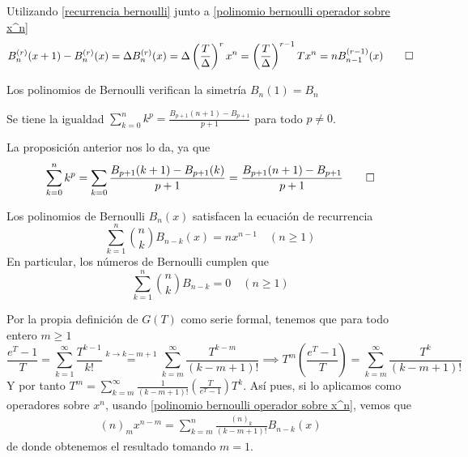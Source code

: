 \begin{demo}
    Utilizando \ref{recurrencia bernoulli} junto a \ref{polinomio bernoulli operador sobre x^n}
    \begin{equation*}
        B_n^{(r)}(x+1) - B_n^{(r)}(x) = \Delta B_n^{(r)}(x) = \Delta \left(\frac{T}{\Delta}\right)^r x^n = \left(\frac{T}{\Delta}\right)^{r-1} T x^n = nB_{n-1}^{(r-1)}(x) \qedhere
    \end{equation*}
\end{demo}

\begin{corolario} \label{simetria bernoulli}
    Los polinomios de Bernoulli verifican la simetría $B_n(1) = B_n$
\end{corolario}

\begin{corolario}
    Se tiene la igualdad $\sum_{k=0}^n k^p =  \frac{B_{p+1}(n+1) - B_{p+1}}{p+1}$
    para todo $p \neq 0$.
\end{corolario}

\begin{demo}
    La proposición anterior nos lo da, ya que
    \begin{equation*}
        \sum_{k=0}^n k^p = \sum_{k=0} \frac{B_{p+1}(k+1) - B_{p+1}(k)}{p+1} = \frac{B_{p+1}(n+1) - B_{p+1}}{p+1} \qedhere
    \end{equation*}
\end{demo}

\begin{proposicion}\label{recurrencia suma bernoulli}
    Los polinomios de Bernoulli $B_n(x)$ satisfacen la ecuación de recurrencia
    \begin{equation*}
        \sum_{k=1}^n \binom{n}{k} B_{n-k}(x) = nx^{n-1} \quad (n \geq 1)
    \end{equation*}
    En particular, los números de Bernoulli cumplen que
    \begin{equation*}
        \sum_{k=1}^n \binom{n}{k} B_{n-k} = 0 \quad (n \geq 1)
    \end{equation*}
\end{proposicion}

\begin{demo}
    Por la propia definición de $G(T)$ como serie formal, tenemos que para todo entero $m \geq 1$
    \begin{equation*}
        \frac{e^T - 1}{T} = \sum_{k=1}^\infty \frac{T^{k-1}}{k!} \stackrel{k \rightarrow k - m + 1}{=} \sum_{k=m}^\infty \frac{T^{k-m}}{(k-m+1)!} \implies T^m \left(\frac{e^T - 1}{T}\right) = \sum_{k=m}^\infty \frac{T^{k}}{(k-m+1)!}
    \end{equation*}
    Y por tanto $T^m = \sum_{k=m}^\infty \frac{1}{(k-m+1)!} (\frac{T}{e^T - 1}) T^k$. Así pues, si lo aplicamos como operadores sobre $x^n$, usando \ref{polinomio bernoulli operador sobre x^n}, vemos que
    \begin{align*}
        (n)_m x^{n-m} = \sum_{k=m}^n \frac{(n)_k}{(k-m+1)!} B_{n-k}(x)
    \end{align*}
    de donde obtenemos el resultado tomando $m=1$.
\end{demo}


